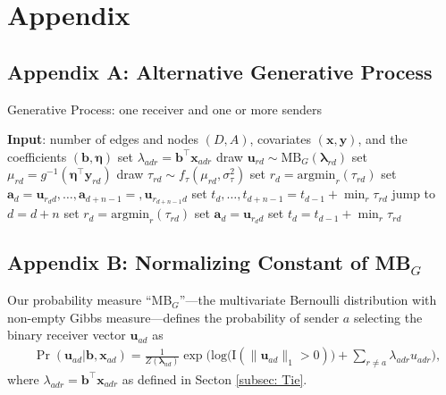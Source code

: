 \documentclass[ba]{imsart}
\numberwithin{equation}{section}
\theoremstyle{plain}
\begin{document}
\section*{Appendix}
	\subsection*{Appendix A: Alternative Generative Process} \label{appendix:alternativeGP}
		\begin{algorithm}[!ht]
			\SetAlgoLined
			\caption{Generative Process: one receiver and one or more senders}
			\begin{algorithmic}
			\STATE \textbf{Input}: number of edges and nodes $(D, A)$, covariates $(\boldsymbol{x}, \boldsymbol{y})$, and the coefficients $(\boldsymbol{b}, \boldsymbol{\eta})$
							\vskip 0.1in				
				\STATE	set $\lambda_{adr} = {\boldsymbol{b}}^{\top}\boldsymbol{x}_{adr}$
				\ENDFOR
				\STATE	draw $\boldsymbol{u}_{rd}  \sim
				\mbox{MB}_G(\boldsymbol{\lambda}_{rd})$
				\STATE		set $\mu_{rd} = g^{-1}(\boldsymbol{\eta}^\top \boldsymbol{y}_{rd})$
				\STATE		draw $\tau_{rd} \sim f_\tau(\mu_{rd}, \sigma_\tau^2)$
				\ENDFOR
				\STATE	set ${r}_d=\mbox{argmin}_{r}(\tau_{rd})$
				\STATE	set $\boldsymbol{a}_d=\boldsymbol{u}_{r_d d},\ldots,\boldsymbol{a}_{d+n-1}= ,\boldsymbol{u}_{r_{d+n-1} d}$
				\STATE	set $t_d, \ldots, t_{d+n-1}=t_{d-1} + \min_r\tau_{rd}$
				\STATE		jump to $d = d+n$
				\ELSE
				\STATE	set ${r}_d = \mbox{argmin}_{r}(\tau_{rd}) $
				\STATE	set $\boldsymbol{a}_d= \boldsymbol{u}_{r_d d}$
				\STATE	set $t_d =t_{d-1} + \min_r\tau_{rd}$
				\ENDIF
				\ENDFOR
			\end{algorithmic}
			\label{alg:generative2}
		\end{algorithm}
	\subsection*{Appendix B: Normalizing Constant of MB$_{G}$}\label{appendix: non-empty Gibbs measure}
	Our probability measure ``MB$_{G}$''---the multivariate Bernoulli distribution with non-empty Gibbs measure---defines the probability of sender $a$ selecting the binary receiver vector $\boldsymbol{u}_{ad}$ as
	\begin{equation*} 
	\begin{aligned}
	& \Pr(\boldsymbol{u}_{ad}|\boldsymbol{b}, \boldsymbol{x}_{ad}) = \frac{1}{Z(\boldsymbol{\lambda}_{ad})}\exp\Big(\mbox{log}\big(\text{I}(\lVert \boldsymbol{u}_{ad} \rVert_1 > 0)\big) + \sum_{r \neq a} \lambda_{adr}u_{adr} \Big),
	\end{aligned}
	\end{equation*}
	where $\lambda_{adr} = {\boldsymbol{b}}^{\top}\boldsymbol{x}_{adr}$ as defined in Secton \ref{subsec: Tie}.
	
\end{document}
